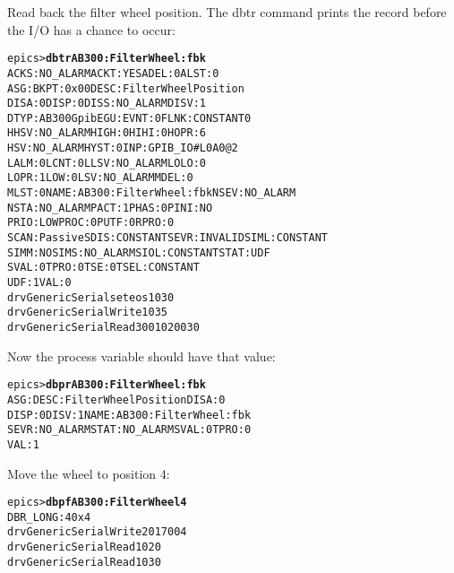 \documentclass[twoside]{article}
\begin{document}
Read back the filter wheel position.  The dbtr command prints the record
before the I/O has a chance to occur:
\begin{alltt}
epics> {\bf dbtr AB300:FilterWheel:fbk}
ACKS: NO_ALARM      ACKT: YES           ADEL: 0             ALST: 0
ASG:                BKPT: 0x00          DESC: Filter Wheel Position
DISA: 0             DISP: 0             DISS: NO_ALARM      DISV: 1
DTYP: AB300Gpib     EGU:                EVNT: 0             FLNK:CONSTANT 0
HHSV: NO_ALARM      HIGH: 0             HIHI: 0             HOPR: 6
HSV: NO_ALARM       HYST: 0             INP:GPIB_IO #L0 A0 @2
LALM: 0             LCNT: 0             LLSV: NO_ALARM      LOLO: 0
LOPR: 1             LOW: 0              LSV: NO_ALARM       MDEL: 0
MLST: 0             NAME: AB300:FilterWheel:fbk             NSEV: NO_ALARM
NSTA: NO_ALARM      PACT: 1             PHAS: 0             PINI: NO
PRIO: LOW           PROC: 0             PUTF: 0             RPRO: 0
SCAN: Passive       SDIS:CONSTANT       SEVR: INVALID       SIML:CONSTANT
SIMM: NO            SIMS: NO_ALARM      SIOL:CONSTANT       STAT: UDF
SVAL: 0             TPRO: 0             TSE: 0              TSEL:CONSTANT
UDF: 1              VAL: 0
drvGenericSerial set eos 1 \verb@\@030
drvGenericSerialWrite 1 \verb@\@035
drvGenericSerialRead 3 \verb@\@001\verb@\@020\verb@\@030
\end{alltt}

Now the process variable should have that value:
\begin{alltt}
epics> {\bf dbpr AB300:FilterWheel:fbk}
ASG:                DESC: Filter Wheel Position             DISA: 0
DISP: 0             DISV: 1             NAME: AB300:FilterWheel:fbk
SEVR: NO_ALARM      STAT: NO_ALARM      SVAL: 0             TPRO: 0
VAL: 1
\end{alltt}



Move the wheel to position 4:

\begin{alltt}
epics> {\bf dbpf AB300:FilterWheel 4}
DBR_LONG:           4         0x4
drvGenericSerialWrite 2 \verb@\@017\verb@\@004
drvGenericSerialRead 1 \verb@\@020
drvGenericSerialRead 1 \verb@\@030
\end{alltt}
\end{document}
